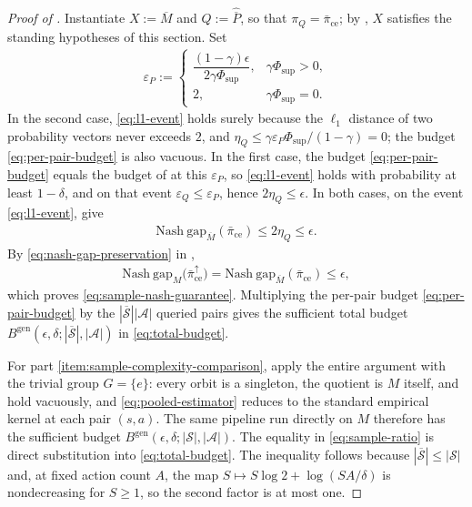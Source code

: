 \documentclass{article}
\theoremstyle{plain}
\theoremstyle{definition}
\theoremstyle{remark}
\newcommand{\Nash}{\mathrm{Nash\ gap}}
\newcommand{\St}{\mathcal{S}}
\newcommand{\Ac}{\mathcal{A}}
\newcommand{\abs}[1]{\left\lvert#1\right\rvert}
\newcommand{\quotient}[1]{\overline{#1}}
\newcommand{\Phisup}{\Phi_{\mathrm{sup}}}
\newcommand{\hatP}{\widehat{\quotient P}}
\newcommand{\pice}{\bar\pi_{\mathrm{ce}}}
\begin{document}
\begin{proof}[Proof of ]
Instantiate $X:=\quotient M$ and $Q:=\hatP$, so that $\pi_Q=\pice$; by
, $X$ satisfies the standing hypotheses of this
section. Set
\begin{align*}
  \varepsilon_P
  :=
  \begin{cases}
    \dfrac{(1-\gamma)\epsilon}{2\gamma\Phisup},
    &\gamma\Phisup>0,\\[4pt]
    2,
    &\gamma\Phisup=0.
  \end{cases}
\end{align*}
In the second case, \eqref{eq:l1-event} holds surely because the $\ell_1$
distance of two probability vectors never exceeds $2$, and
$\eta_Q\le\gamma\varepsilon_P\Phisup/(1-\gamma)=0$; the budget
\eqref{eq:per-pair-budget} is also vacuous. In the first case, the budget
\eqref{eq:per-pair-budget} equals the budget of
 at this $\varepsilon_P$, so
\eqref{eq:l1-event} holds with probability at least $1-\delta$, and on that
event $\varepsilon_Q\le\varepsilon_P$, hence $2\eta_Q\le\epsilon$. In both
cases, on the event \eqref{eq:l1-event},
 give
\begin{align*}
  \Nash_{\quotient M}(\pice)
  \le
  2\eta_Q
  \le
  \epsilon.
\end{align*}
By \eqref{eq:nash-gap-preservation} in ,
\begin{align*}
  \Nash_M\big(\pice^\uparrow\big)
  =
  \Nash_{\quotient M}(\pice)
  \le
  \epsilon,
\end{align*}
which proves \eqref{eq:sample-nash-guarantee}. Multiplying the per-pair
budget \eqref{eq:per-pair-budget} by the $\abs{\quotient\St}\abs\Ac$ queried
pairs gives the sufficient total budget
$B^{\mathrm{gen}}(\epsilon,\delta;\abs{\quotient\St},\abs\Ac)$ in
\eqref{eq:total-budget}.

For part \ref{item:sample-complexity-comparison}, apply the entire argument
with the trivial group $G=\{e\}$: every orbit is a singleton, the quotient is
$M$ itself,  and  hold
vacuously, and \eqref{eq:pooled-estimator} reduces to the standard empirical
kernel at each pair $(s,a)$. The same pipeline run directly on $M$ therefore
has the sufficient budget
$B^{\mathrm{gen}}(\epsilon,\delta;\abs\St,\abs\Ac)$. The equality in
\eqref{eq:sample-ratio} is direct substitution into \eqref{eq:total-budget}.
The inequality follows because $\abs{\quotient\St}\le\abs\St$ and, at fixed
action count $A$, the map $S\mapsto S\log2+\log(SA/\delta)$ is nondecreasing
for $S\ge1$, so the second factor is at most one.
\end{proof}
\end{document}
